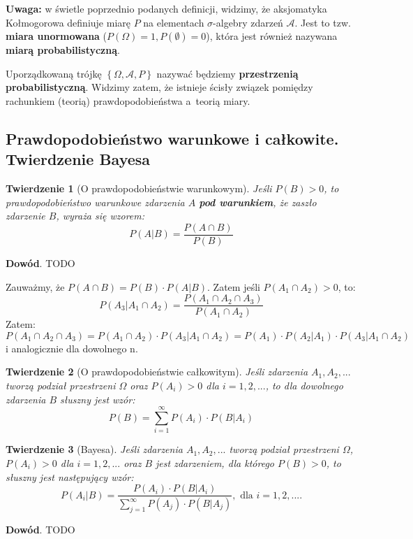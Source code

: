 \documentclass[10pt,a4paper]{article}
\newtheorem{twier}{Twierdzenie}[section]
\begin{document}
\textbf{Uwaga:} w świetle poprzednio podanych definicji, widzimy, że aksjomatyka Kołmogorowa definiuje miarę $P$ na elementach $\sigma$-algebry zdarzeń $\mathscr{A}$. Jest
to tzw. \textbf{miara unormowana} ($P(\Omega)=1, P(\emptyset)=0$), która jest również nazywana \textbf{miarą probabilistyczną}.

Uporządkowaną trójkę $\left\lbrace\Omega,\mathscr{A},P\right\rbrace$ nazywać będziemy \textbf{przestrzenią probabilistyczną}. Widzimy zatem, że istnieje ścisły związek
pomiędzy rachunkiem (teorią) prawdopodobieństwa a~teorią miary.
\subsection{Prawdopodobieństwo warunkowe i całkowite. Twierdzenie Bayesa}
\begin{twier}[O prawdopodobieństwie warunkowym]
Jeśli $P(B)>0$, to prawdopodobieństwo warunkowe zdarzenia $A$ \textbf{pod warunkiem}, że zaszło zdarzenie $B$, wyraża się wzorem:
\begin{equation}
P(A|B) = \frac{P(A\cap B)}{P(B)} 
\end{equation}
\end{twier}
\textbf{Dowód}. TODO

Zauważmy, że $P(A\cap B)=P(B)\cdot P(A|B)$. Zatem jeśli $P(A_1\cap A_2)>0$, to:
\[P(A_3|A_1\cap A_2)=\frac{P(A_1\cap A_2 \cap A_3)}{P(A_1\cap A_2)}\]
Zatem:
\[ P(A_1\cap A_2 \cap A_3) = P(A_1\cap A_2)\cdot P(A_3|A_1\cap A_2) = P(A_1)\cdot P(A_2|A_1)\cdot P(A_3|A_1\cap A_2) \]
i analogicznie dla dowolnego n.

\begin{twier}[O prawdopodobieństwie całkowitym]
Jeśli zdarzenia $A_1,A_2,...$ tworzą podział przestrzeni $\Omega$ oraz $P(A_i)>0$ dla $i=1,2,...$, to dla dowolnego zdarzenia $B$ słuszny jest wzór:
\begin{equation}
P(B)=\sum_{i=1}^{\infty}P(A_i)\cdot P(B|A_i) 
\end{equation}
\end{twier}

\begin{twier}[Bayesa]
Jeśli zdarzenia $A_1,A_2,...$ tworzą podział przestrzeni $\Omega$, $P(A_i)>0$ dla $i=1,2,...$ oraz $B$ jest zdarzeniem, dla którego $P(B)>0$, to słuszny 
jest następujący wzór:
\begin{equation}
P(A_i|B) = \frac{P(A_i)\cdot P(B|A_i)}{\sum_{j=1}^{\infty}P(A_j)\cdot P(B|A_j)}, \textrm{ dla } i=1,2,...\textrm{.} 
\end{equation}
\end{twier}
\textbf{Dowód}. TODO
\end{document}
